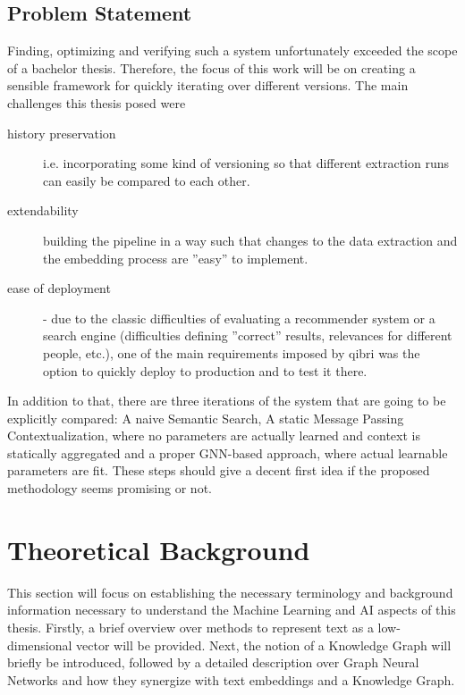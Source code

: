 \documentclass[draft,final]{vutinfth} %
\begin{document}
\section{Problem Statement}
Finding, optimizing and verifying such a system unfortunately exceeded the scope of a bachelor thesis. Therefore, the focus of this work will be on creating a sensible framework for quickly iterating over different versions. The main challenges this thesis posed were
\begin{description}
    \item[history preservation] i.e. incorporating some kind of versioning so that different extraction runs can easily be compared to each other.
    \item[extendability] building the pipeline in a way such that changes to the data extraction and the embedding process are ''easy'' to implement.
    \item[ease of deployment] - due to the classic difficulties of evaluating a recommender system or a search engine (difficulties defining ''correct'' results, relevances for different people, etc.), one of the main requirements imposed by qibri was the option to quickly deploy to production and to test it there.
\end{description}
In addition to that, there are three iterations of the system that are going to be explicitly compared: A naive Semantic Search, A static Message Passing Contextualization, where no parameters are actually learned and context is statically aggregated and a proper GNN-based approach, where actual learnable parameters are fit. These steps should give a decent first idea if the proposed methodology seems promising or not.


\chapter{Theoretical Background}
This section will focus on establishing the necessary terminology and background information necessary to understand the Machine Learning and AI aspects of this thesis. Firstly, a brief overview over methods to represent text as a low-dimensional vector will be provided. Next, the notion of a Knowledge Graph will briefly be introduced, followed by a detailed description over Graph Neural Networks and how they synergize with text embeddings and a Knowledge Graph.
\end{document}
